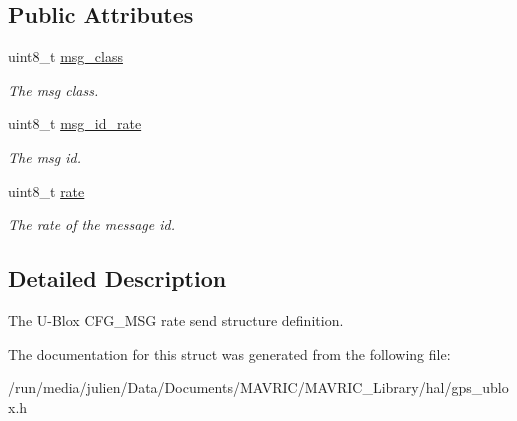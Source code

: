 \subsection*{Public Attributes}
\begin{DoxyCompactItemize}
\item 
\hypertarget{structubx__cfg__msg__rate__send__t_a0c49adbb9d5f5ffd48aa6e69ae282484}{uint8\+\_\+t \hyperlink{structubx__cfg__msg__rate__send__t_a0c49adbb9d5f5ffd48aa6e69ae282484}{msg\+\_\+class}}\label{structubx__cfg__msg__rate__send__t_a0c49adbb9d5f5ffd48aa6e69ae282484}

\begin{DoxyCompactList}\small\item\em The msg class. \end{DoxyCompactList}\item 
\hypertarget{structubx__cfg__msg__rate__send__t_a0fdeb64acc41f4c1352ab1592f59ef12}{uint8\+\_\+t \hyperlink{structubx__cfg__msg__rate__send__t_a0fdeb64acc41f4c1352ab1592f59ef12}{msg\+\_\+id\+\_\+rate}}\label{structubx__cfg__msg__rate__send__t_a0fdeb64acc41f4c1352ab1592f59ef12}

\begin{DoxyCompactList}\small\item\em The msg id. \end{DoxyCompactList}\item 
\hypertarget{structubx__cfg__msg__rate__send__t_a1a8425c3eff13f17b0028d435eca3885}{uint8\+\_\+t \hyperlink{structubx__cfg__msg__rate__send__t_a1a8425c3eff13f17b0028d435eca3885}{rate}}\label{structubx__cfg__msg__rate__send__t_a1a8425c3eff13f17b0028d435eca3885}

\begin{DoxyCompactList}\small\item\em The rate of the message id. \end{DoxyCompactList}\end{DoxyCompactItemize}


\subsection{Detailed Description}
The U-\/\+Blox C\+F\+G\+\_\+\+M\+S\+G rate send structure definition. 

The documentation for this struct was generated from the following file\+:\begin{DoxyCompactItemize}
\item 
/run/media/julien/\+Data/\+Documents/\+M\+A\+V\+R\+I\+C/\+M\+A\+V\+R\+I\+C\+\_\+\+Library/hal/gps\+\_\+ublox.\+h\end{DoxyCompactItemize}
